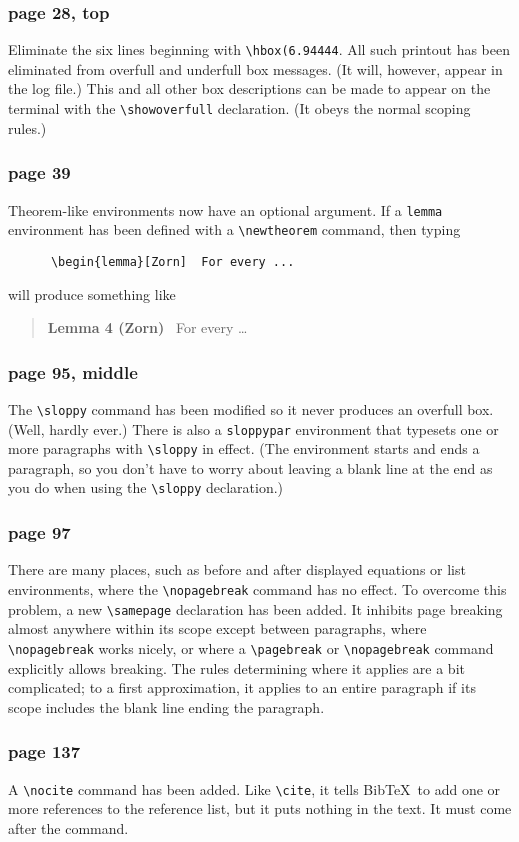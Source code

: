 \subsubsection* {page 28, top}

Eliminate the six lines beginning with \hbox{\verb"\hbox(6.94444"}.
All such printout has been eliminated from overfull and underfull box
messages.  (It will, however, appear in the log file.) This and all
other box descriptions can be made to appear on the terminal with the
\hbox{\verb"\showoverfull"} declaration.  (It obeys the normal scoping
rules.)

\subsubsection*{page 39}
Theorem-like environments now have an optional argument.  
If a \hbox{\verb"lemma"} environment has been defined with
a \hbox{\verb"\newtheorem"} command, then typing
\begin{verbatim}
      \begin{lemma}[Zorn]  For every ...
\end{verbatim}
will produce something like
\begin{quote}
  {\bf Lemma 4 (Zorn)} \ For every \ldots
\end{quote}

\subsubsection* {page 95, middle}

The \hbox{\verb"\sloppy"} command has been modified so it never
produces an overfull box.  (Well, hardly ever.)  There is also
a \hbox{\tt sloppypar} environment that typesets one or more
paragraphs with \hbox{\verb"\sloppy"} in effect.  (The environment
starts and ends a paragraph, so you don't have to worry about
leaving a blank line at the end as you do when using the
\hbox{\verb"\sloppy"} declaration.)


\subsubsection*{page 97}

There are many places, such as before and after displayed equations or
list environments, where the \hbox{\verb|\nopagebreak|} command has no
effect.  To overcome this problem, a new \hbox{\verb|\samepage|}
declaration has been added.  It inhibits page breaking almost anywhere
within its scope except between paragraphs, where
\hbox{\verb|\nopagebreak|} works nicely, or where a
\hbox{\verb|\pagebreak|} or \hbox{\verb|\nopagebreak|} command
explicitly allows breaking.  The rules determining where it applies
are a bit complicated; to a first approximation, it applies to an
entire paragraph if its scope includes the blank line ending
the paragraph.

\subsubsection*{page 137}

A \hbox{\verb|\nocite|} command has been added.  Like
\hbox{\verb|\cite|}, it tells Bib\TeX\ to add one or more
references to the reference list, but it puts nothing in the
text.  It must come after the \hbox{\verb||}
command.


